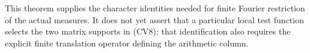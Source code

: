 This theorem supplies the character identities needed for finite
Fourier restriction of the actual measures.  It does not yet
assert that a particular local test function selects the two
matrix supports in (CV8); that identification also requires the
explicit finite translation operator defining the arithmetic
column.


